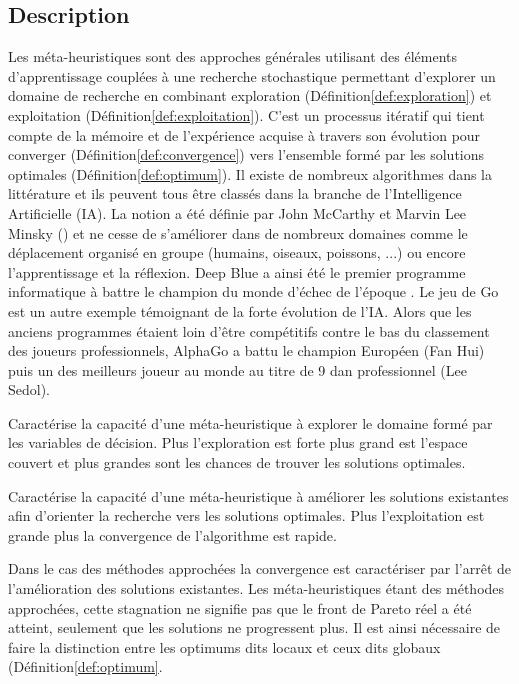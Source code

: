 \subsection{Description} %
\label{sub:description}
Les méta-heuristiques sont des approches générales utilisant des éléments d’apprentissage
couplées à une recherche stochastique permettant d’explorer un domaine de recherche
en combinant exploration (Définition\ref{def:exploration}) et exploitation (Définition\ref{def:exploitation}).
C’est un processus itératif qui tient compte de la mémoire et de l’expérience acquise
à travers son évolution pour converger (Définition\ref{def:convergence})
vers l’ensemble formé par les solutions optimales (Définition\ref{def:optimum}).
Il existe de nombreux algorithmes dans la littérature et ils peuvent tous être classés
dans la branche de l’Intelligence Artificielle (IA).
La notion a été définie par John McCarthy et Marvin Lee Minsky ()
et ne cesse de s’améliorer dans de nombreux domaines comme le déplacement organisé
en groupe (humains, oiseaux, poissons, ...) ou encore l’apprentissage et la réflexion.
Deep Blue a ainsi été le premier programme informatique à battre le champion du monde
d’échec de l’époque \parencite{Hsu199970}.
Le jeu de Go est un autre exemple témoignant de la forte évolution de l’IA. Alors que
les anciens programmes étaient loin d’être compétitifs contre le bas du classement
des joueurs professionnels, AlphaGo \parencite{Silver2016484} a battu le champion Européen (Fan Hui)
puis un des meilleurs joueur au monde au titre de 9 dan professionnel (Lee Sedol).

\begin{Def}[Exploration]\label{def:exploration}
Caractérise la capacité d’une méta-heuristique à explorer le domaine formé par les
variables de décision. Plus l’exploration est forte plus grand est l’espace couvert
et plus grandes sont les chances de trouver les solutions optimales.
\end{Def}

\begin{Def}[Exploitation]\label{def:exploitation}
Caractérise la capacité d’une méta-heuristique à améliorer les solutions existantes
afin d’orienter la recherche vers les solutions optimales. Plus l’exploitation est
grande plus la convergence de l’algorithme est rapide.
\end{Def}

\begin{Def}[Convergence]\label{def:convergence}
Dans le cas des méthodes approchées la convergence est caractériser par l’arrêt
de l’amélioration des solutions existantes. Les méta-heuristiques étant des
méthodes approchées, cette stagnation ne signifie pas que le front de Pareto réel
a été atteint, seulement que les solutions ne progressent plus. Il est ainsi
nécessaire de faire la distinction entre les optimums dits locaux et ceux dits
globaux (Définition\ref{def:optimum}.
\end{Def}

